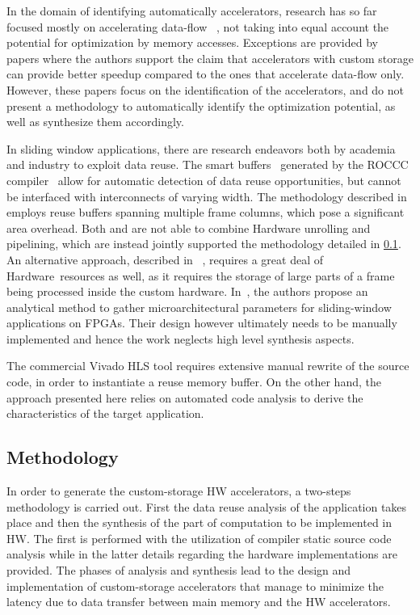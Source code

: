 \documentclass[]{usiinfthesis}
\newcommand{\HW}{{Hardware}}
\begin{document}
In the domain of identifying automatically accelerators, research has 
so far focused mostly on accelerating data-flow~\cite{GiaquintaMar15} \cite{GutinFeb12}, 
not taking into equal account the potential for optimization by memory accesses. 
Exceptions are provided by papers \cite{BiswasMar06} \cite{ HaaBOct2014}
where the authors support the claim that accelerators with custom
storage can provide better speedup compared to the ones that
accelerate data-flow only. However, these papers focus on the
identification of the accelerators, and do not present a methodology 
to automatically identify the optimization potential, as well as
synthesize them accordingly.\par
In sliding window applications, there are research endeavors
both by academia and industry to exploit data reuse. The smart
buffers~\cite{GuoJun04} generated by the ROCCC
compiler~\cite{VillarrealMay10} allow for automatic detection of data
reuse opportunities, but cannot be interfaced 
with interconnects of varying width.
%
The methodology
described in \cite{MeeusMar14} employs reuse buffers spanning multiple
frame columns, which pose a significant area
overhead. Both \cite{GuoJun04} and \cite{MeeusMar14} are not able
to combine Hardware unrolling and pipelining, which are instead jointly
supported the methodology detailed in \ref{sec:dr_meth}. An alternative 
approach, described in
~\cite{DongMar07}, requires a great deal of \HW\ resources as well, as it 
requires the storage of large parts of a frame being processed inside the custom
hardware.  In~\cite{LeeserApr06}, the authors propose an analytical
method to gather microarchitectural parameters for sliding-window
applications on FPGAs. Their design however ultimately needs to be
manually implemented and hence the work neglects high level synthesis
aspects.\par
%
The commercial Vivado HLS tool requires
extensive manual rewrite of the source code, in order to instantiate
a reuse memory buffer. On the other hand, the approach presented 
here relies on automated code
analysis to derive the characteristics of the target application.\par 



\subsection{Methodology}
\label{sec:dr_meth}

In order to generate the custom-storage HW accelerators, a two-steps methodology is 
carried out. First the data reuse analysis of the application takes place and 
then the synthesis of the part of computation to be implemented in HW.
The first is performed with the utilization of compiler static source code analysis while
in the latter details regarding the hardware implementations are provided.
The phases of analysis and synthesis lead to the design and implementation of 
custom-storage accelerators that manage to minimize the latency due to data 
transfer between main memory and the HW accelerators.
\end{document}
